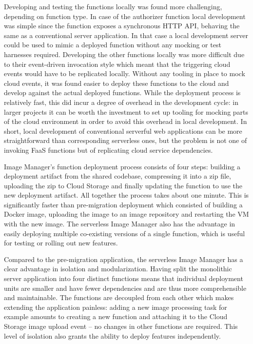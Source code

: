 Developing and testing the functions locally was found more challenging, depending on function type. In case of the authorizer function local development was simple since the function exposes a synchronous HTTP API, behaving the same as a conventional server application. In that case a local development server could be used to mimic a deployed function without any mocking or test harnesses required. Developing the other functions locally was more difficult due to their event-driven invocation style which meant that the triggering cloud events would have to be replicated locally. Without any tooling in place to mock cloud events, it was found easier to deploy these functions to the cloud and develop against the actual deployed functions. While the deployment process is relatively fast, this did incur a degree of overhead in the development cycle: in larger projects it can be worth the investment to set up tooling for mocking parts of the cloud environment in order to avoid this overhead in local development. In short, local development of conventional serverful web applications can be more straightforward than corresponding serverless ones, but the problem is not one of invoking FaaS functions but of replicating cloud service dependencies.

Image Manager's function deployment process consists of four steps: building a deployment artifact from the shared codebase, compressing it into a zip file, uploading the zip to Cloud Storage and finally updating the function to use the new deployment artifact. All together the process takes about one minute. This is significantly faster than pre-migration deployment which consisted of building a Docker image, uploading the image to an image repository and restarting the VM with the new image. The serverless Image Manager also has the advantage in easily deploying multiple co-existing versions of a single function, which is useful for testing or rolling out new features.

Compared to the pre-migration application, the serverless Image Manager has a clear advantage in isolation and modularization. Having split the monolithic server application into four distinct functions means that individual deployment units are smaller and have fewer dependencies and are thus more comprehensible and maintainable. The functions are decoupled from each other which makes extending the application painless: adding a new image processing task for example amounts to creating a new function and attaching it to the Cloud Storage image upload event -- no changes in other functions are required. This level of isolation also grants the ability to deploy features independently.

